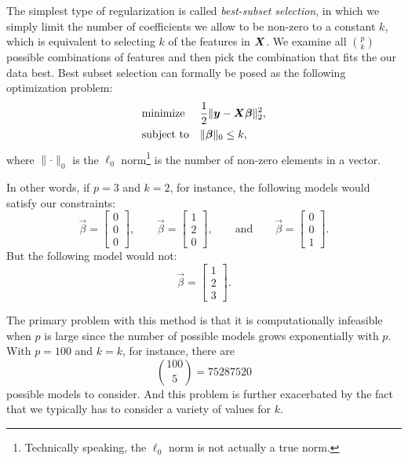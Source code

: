 The simplest type of regularization is called \emph{best-subset selection}, in which we simply limit the number of coefficients we allow to be non-zero to a constant \(k\), which is equivalent to selecting \(k\) of the features in \(\boldsymbol{X}\). We examine all \(\binom{p}{k}\) possible combinations of features and then pick the combination that fits the our data best. Best subset selection can formally be posed as the following optimization problem:
\[
  \begin{aligned}
     & \text{minimize}   &  & \frac{1}{2} \lVert \boldsymbol{y} - \boldsymbol{X}\boldsymbol{\beta}\rVert^2_2, \\
     & \text{subject to} &  & \lVert \boldsymbol{\beta} \rVert_0 \leq k,
  \end{aligned}
\]
where \(\lVert \cdot \rVert_0\) is the \(\ell_0\) norm\footnote{Technically speaking, the \(\ell_0\) norm is not actually a true norm.} is the number of non-zero elements in a vector.

In other words, if \(p = 3\) and \(k = 2\), for instance, the following models would satisfy our constraints:
\[
  \vec{\beta} = \begin{bmatrix}0 \\ 0 \\ 0\end{bmatrix},\qquad \vec{\beta} = \begin{bmatrix}1 \\ 2 \\ 0\end{bmatrix},\qquad \text{and} \qquad \vec{\beta} = \begin{bmatrix}0 \\ 0 \\ 1\end{bmatrix}.
\]
But the following model would not:
\[
  \vec{\beta} = \begin{bmatrix}1 \\ 2 \\ 3\end{bmatrix}.
\]


The primary problem with this method is that it is computationally infeasible when \(p\) is large since the number of possible models grows exponentially with \(p\). With \(p = 100\) and \(k = k\), for instance, there are
\[
  \binom{100}{5} = \num{75287520}
\]
possible models to consider. And this problem is further exacerbated by the fact that we typically has to consider a variety of values for \(k\).


